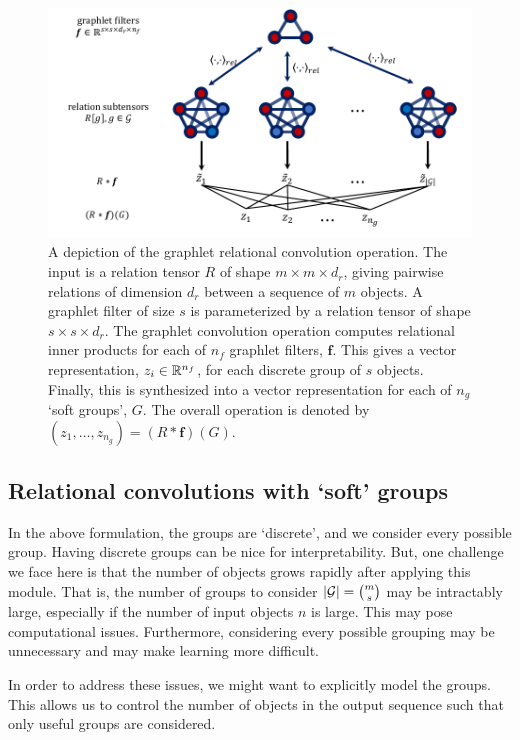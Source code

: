 \begin{figure}[!ht]
    \includegraphics[width=\textwidth]{figs/relconv_diagram2.pdf}
    \caption{A depiction of the graphlet relational convolution operation. The input is a relation tensor $R$ of shape $m \times m \times d_r$, giving pairwise relations of dimension $d_r$ between a sequence of $m$ objects. A graphlet filter of size $s$ is parameterized by a relation tensor of shape $s \times s \times d_r$. The graphlet convolution operation computes relational inner products for each of $n_f$ graphlet filters, $\bm{f}$. This gives a vector representation, $z_i \in \mathbb{R}^{n_f}$, for each discrete group of $s$ objects. Finally, this is synthesized into a vector representation for each of $n_g$ `soft groups', $G$. The overall operation is denoted by $(z_1, \ldots, z_{n_g}) = (R \ast \bm{f})(G)$.}\label{fig:relconvdiagram}
\end{figure}


\subsection{Relational convolutions with `soft' groups}

In the above formulation, the groups are `discrete', and we consider every possible group. Having discrete groups can be nice for interpretability. But, one challenge we face here is that the number of objects grows rapidly after applying this module. That is, the number of groups to consider $\left\lvert{\mathcal{G}}\right\rvert = \binom{m}{s}$ may be intractably large, especially if the number of input objects $n$ is large. This may pose computational issues. Furthermore, considering every possible grouping may be unnecessary and may make learning more difficult.

In order to address these issues, we might want to explicitly model the groups. This allows us to control the number of objects in the output sequence such that only useful groups are considered.

